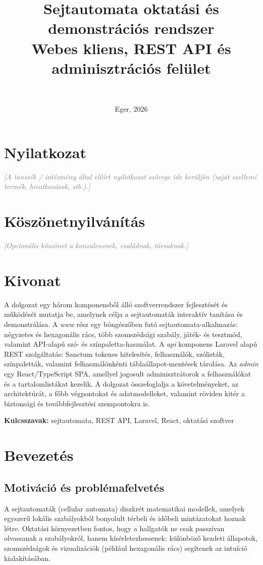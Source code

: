 \documentclass[12pt,a4paper,openany]{book}
\title{Sejtautomata oktatási és demonstrációs rendszer\\[0.4em]
\large Webes kliens, REST API és adminisztrációs felület}
\author{\placeholder{Hallgató neve}\\\placeholder{Szak, azonosító}}
\date{Eger, 2026}
\newcommand{\placeholder}[1]{\textit{\textcolor{gray}{[#1]}}}
\begin{document}
\frontmatter
\maketitle

\chapter*{Nyilatkozat}
\placeholder{A tanszék / intézmény által előírt nyilatkozat szövege ide kerüljön (saját szellemi termék, hivatkozások, stb.).}

\chapter*{Köszönetnyilvánítás}
\placeholder{Opcionális köszönet a konzulensnek, családnak, társaknak.}

\chapter*{Kivonat}
A dolgozat egy három komponensből álló szoftverrendszer fejlesztését és működését mutatja be, amelynek célja a sejtautomaták interaktív tanítása és demonstrálása. A \emph{www} rész egy böngészőben futó sejtautomata-alkalmazás: négyzetes és hexagonális rács, több szomszédsági szabály, játék- és tesztmód, valamint API-alapú szó- és színpaletta-használat. A \emph{api} komponens Laravel alapú REST szolgáltatás: Sanctum tokenes hitelesítés, felhasználók, szólisták, színpaletták, valamint felhasználónkénti táblaállapot-mentések tárolása. Az \emph{admin} egy React/TypeScript SPA, amellyel jogosult adminisztrátorok a felhasználókat és a tartalomlistákat kezelik. A dolgozat összefoglalja a követelményeket, az architektúrát, a főbb végpontokat és adatmodelleket, valamint röviden kitér a biztonsági és továbbfejlesztési szempontokra is.

\textbf{Kulcsszavak:} sejtautomata, REST API, Laravel, React, oktatási szoftver

\tableofcontents

\mainmatter

\chapter{Bevezetés}

\section{Motiváció és problémafelvetés}
A sejtautomaták (cellular automata) diszkrét matematikai modellek, amelyek egyszerű lokális szabályokból bonyolult térbeli és időbeli mintázatokat hoznak létre. Oktatási környezetben fontos, hogy a hallgatók ne csak passzívan olvassanak a szabályokról, hanem kísérletezhessenek: különböző kezdeti állapotok, szomszédságok és vizualizációk (például hexagonális rács) segítenek az intuíció kialakításában.
\end{document}
